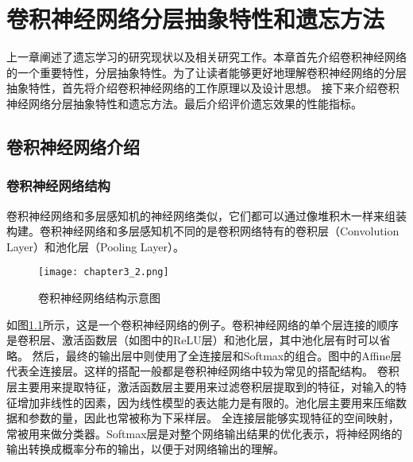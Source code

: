 
\chapter{卷积神经网络分层抽象特性和遗忘方法}
上一章阐述了遗忘学习的研究现状以及相关研究工作。本章首先介绍卷积神经网络的一个重要特性，分层抽象特性。为了让读者能够更好地理解卷积神经网络的分层抽象特性，首先将介绍卷积神经网络的工作原理以及设计思想。
接下来介绍卷积神经网络分层抽象特性和遗忘方法。最后介绍评价遗忘效果的性能指标。

\section{卷积神经网络介绍}

\subsection{卷积神经网络结构}
卷积神经网络和多层感知机的神经网络类似，它们都可以通过像堆积木一样来组装构建。卷积神经网络和多层感知机不同的是卷积网络特有的卷积层（Convolution Layer）和池化层（Pooling Layer）。

\begin{figure}
    \centering
    \texttt{[image: chapter3\_2.png]}
    \caption{卷积神经网络结构示意图}
    \label{fig:chapter3_2}
\end{figure}

如图\ref{fig:chapter3_2}所示，这是一个卷积神经网络的例子。卷积神经网络的单个层连接的顺序是卷积层、激活函数层（如图中的ReLU层）和池化层，其中池化层有时可以省略。
然后，最终的输出层中则使用了全连接层和Softmax的组合。图中的Affine层代表全连接层。这样的搭配一般都是卷积神经网络中较为常见的搭配结构。
卷积层主要用来提取特征，激活函数层主要用来过滤卷积层提取到的特征，对输入的特征增加非线性的因素，因为线性模型的表达能力是有限的。池化层主要用来压缩数据和参数的量，因此也常被称为下采样层。
全连接层能够实现特征的空间映射，常被用来做分类器。Softmax层是对整个网络输出结果的优化表示，将神经网络的输出转换成概率分布的输出，以便于对网络输出的理解。

